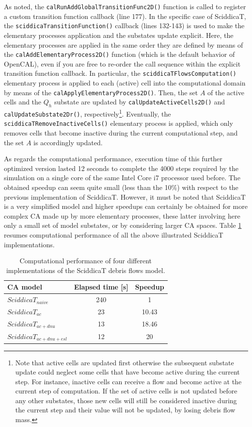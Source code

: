 As noted, the \verb'calRunAddGlobalTransitionFunc2D()' function is
called to register a custom transition function callback (line
177). In the specific case of SciddicaT, the
\verb'sciddicaTransitionFunction()' callback (lines 132-143) is used
to make the elementary processes application and the substates update
explicit. Here, the elementary processes are applied in the same order
they are defined by means of the \verb'calAddElementaryProcess2D()'
function (which is the default behavior of OpenCAL), even if you are
free to re-order the call sequence within the explicit transition
function callback. In particular, the \verb'sciddicaTFlowsComputation()'
elementary process is applied to each (active) cell into the
computational domain by means of the
\verb'calApplyElementaryProcess2D()'. Then, the set $A$ of the active
cells and the $Q_h$ substate are updated by
\verb'calUpdateActiveCells2D()' and \verb'calUpdateSubstate2Dr()',
respectively\footnote{Note that active cells are updated first
  otherwise the subsequent substate update could neglect some cells
  that have become active during the current step. For instance,
  inactive cells can receive a flow and become active at the current
  step of computation. If the set of active cells is not updated
  before any other substates, those new cells will still be considered
  inactive during the current step and their value will not be
  updated, by losing debris flow mass.}. Eventually, the
\verb'sciddicaTRemoveInactiveCells()' elementary process is
applied, which only removes cells that become inactive during the
current computational step, and the set $A$ is accordingly updated.


As regards the computational performance, execution time of this
further optimized version lasted 12 seconds to complete the 4000 steps
required by the simulation on a single core of the same Intel Core i7
processor used before. The obtained speedup can seem quite small (less
than the 10\%) with respect to the previous implementation of
SciddicaT. However, it must be noted that SciddicaT is a very
simplified model and higher speedups can certainly be obtained for
more complex CA made up by more elementary processes, these latter
involving here only a small set of model substates, or by considering
larger CA spaces. Table \ref{tab:speedup} resumes computational
performance of all the above illustrated SciddicaT implementations.

\begin{table}
  \centering
  \begin{tabular}{l|c|c}
    \hline
    CA model & Elapsed time [s] & Speedup \\
    \hline
    $SciddicaT_{naive}$      & 240 & 1\\
    $SciddicaT_{ac}$         & 23  & 10.43\\
    $SciddicaT_{ac+dnu}$     & 13  & 18.46\\
    $SciddicaT_{ac+dnu+esl}$  & 12  & 20\\
    \hline
  \end{tabular}
  \caption{Computational performance of four different
    implementations of the SciddicaT debris flows model.}
  \label{tab:speedup}
\end{table}


